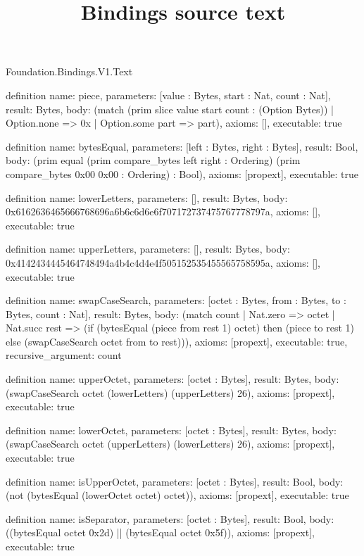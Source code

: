 \begin{lexlean}{Foundation.Bindings.V1.Text}
\title{Bindings source text}
\begin{semanticmodule}
definition{
  name: piece,
  parameters: [value : Bytes, start : Nat, count : Nat],
  result: Bytes,
  body: (match (prim slice value start count : (Option Bytes))
    | Option.none => 0x
    | Option.some part => part),
  axioms: [],
  executable: true
}

definition{
  name: bytesEqual,
  parameters: [left : Bytes, right : Bytes],
  result: Bool,
  body: (prim equal (prim compare_bytes left right : Ordering) (prim compare_bytes 0x00 0x00 : Ordering) : Bool),
  axioms: [propext],
  executable: true
}

definition{
  name: lowerLetters,
  parameters: [],
  result: Bytes,
  body: 0x6162636465666768696a6b6c6d6e6f707172737475767778797a,
  axioms: [],
  executable: true
}

definition{
  name: upperLetters,
  parameters: [],
  result: Bytes,
  body: 0x4142434445464748494a4b4c4d4e4f505152535455565758595a,
  axioms: [],
  executable: true
}

definition{
  name: swapCaseSearch,
  parameters: [octet : Bytes, from : Bytes, to : Bytes, count : Nat],
  result: Bytes,
  body: (match count
    | Nat.zero => octet
    | Nat.succ rest => (if (bytesEqual (piece from rest 1) octet) then (piece to rest 1) else (swapCaseSearch octet from to rest))),
  axioms: [propext],
  executable: true,
  recursive_argument: count
}

definition{
  name: upperOctet,
  parameters: [octet : Bytes],
  result: Bytes,
  body: (swapCaseSearch octet (lowerLetters) (upperLetters) 26),
  axioms: [propext],
  executable: true
}

definition{
  name: lowerOctet,
  parameters: [octet : Bytes],
  result: Bytes,
  body: (swapCaseSearch octet (upperLetters) (lowerLetters) 26),
  axioms: [propext],
  executable: true
}

definition{
  name: isUpperOctet,
  parameters: [octet : Bytes],
  result: Bool,
  body: (not (bytesEqual (lowerOctet octet) octet)),
  axioms: [propext],
  executable: true
}

definition{
  name: isSeparator,
  parameters: [octet : Bytes],
  result: Bool,
  body: ((bytesEqual octet 0x2d) || (bytesEqual octet 0x5f)),
  axioms: [propext],
  executable: true
}


\end{semanticmodule}
\end{lexlean}
